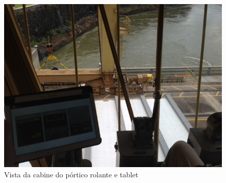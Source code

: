 \begin{figure}[h]
\centering
	\includegraphics[width=0.9\columnwidth]{figs/IMG_2007.JPG}
	\caption{Vista da cabine do pórtico rolante e tablet}
	\label{fig::cabine2}
\end{figure}